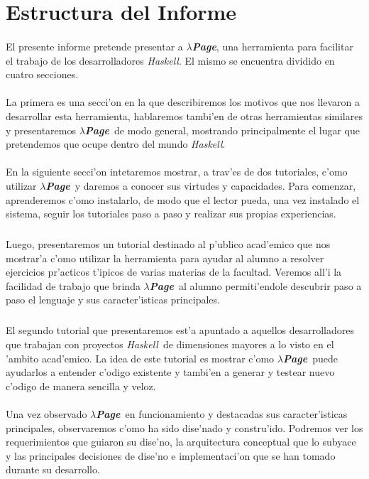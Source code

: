 \documentclass[a4paper]{article}
\newcommand{\haskell}{\textsl{Haskell}}
\newcommand{\hpage}{\textbf{\textsl{$\lambda$Page}}}
\begin{document}
\tableofcontents

\newpage
\section{Estructura del Informe}
\paragraph{}El presente informe pretende presentar a \hpage, una herramienta para facilitar el trabajo de los desarrolladores \haskell.  El mismo se encuentra dividido en cuatro secciones.
\paragraph{}La primera es una secci'on en la que describiremos los motivos que nos llevaron a desarrollar esta herramienta, hablaremos tambi'en de otras herramientas similares y presentaremos \hpage\ de modo general, mostrando principalmente el lugar que pretendemos que ocupe dentro del mundo \haskell.
\paragraph{}En la siguiente secci'on intetaremos mostrar, a trav'es de dos tutoriales, c'omo utilizar \hpage\ y daremos a conocer sus virtudes y capacidades.  Para comenzar, aprenderemos c'omo instalarlo, de modo que el lector pueda, una vez instalado el sistema, seguir los tutoriales paso a paso y realizar sus propias experiencias.
\subparagraph{}Luego, presentaremos un tutorial destinado al p'ublico acad'emico que nos mostrar'a c'omo utilizar la herramienta para ayudar al alumno a resolver ejercicios pr'acticos t'ipicos de varias materias de la facultad.  Veremos all'i la facilidad de trabajo que brinda \hpage\ al alumno permiti'endole descubrir paso a paso el lenguaje y sus caracter'isticas principales.
\subparagraph{}El segundo tutorial que presentaremos est'a apuntado a aquellos desarrolladores que trabajan con proyectos \haskell\ de dimensiones mayores a lo visto en el 'ambito acad'emico.  La idea de este tutorial es mostrar c'omo \hpage\ puede ayudarlos a entender c'odigo existente y tambi'en a generar y testear nuevo c'odigo de manera sencilla y veloz.
\paragraph{}Una vez observado \hpage\ en funcionamiento y destacadas sus caracter'isticas principales, observaremos c'omo ha sido dise'nado y constru'ido.  Podremos ver los requerimientos que guiaron su dise'no, la arquitectura conceptual que lo subyace y las principales decisiones de dise'no e implementaci'on que se han tomado durante su desarrollo.
\end{document}
